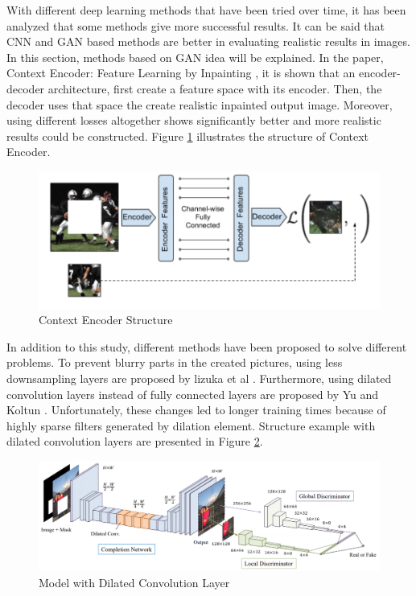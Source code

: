 With different deep learning methods that have been tried over time, it has been analyzed that some methods give more successful results. It can be said that CNN and GAN based methods are better in evaluating realistic results in images. In this section, methods based on GAN idea will be explained. \newline
In the paper, Context Encoder: Feature Learning by Inpainting \cite{context_encoders}, it is shown that an encoder-decoder architecture, first create a feature space with its encoder. Then, the decoder uses that space the create realistic inpainted output image. Moreover, using different losses altogether shows significantly better and more realistic results could be constructed. Figure \ref{fig:context-encoder} illustrates the structure of Context Encoder.

\begin{figure}[h]
    \centering
    \includegraphics[scale=0.5]{figures/chapter4/context-encoder-example.png}
    \caption{Context Encoder Structure}
    \label{fig:context-encoder}
\end{figure}

In addition to this study, different methods have been proposed to solve different problems. To prevent blurry parts in the created pictures, using less downsampling layers are proposed by lizuka et al \cite{Iizuka2017}. Furthermore, using dilated convolution layers instead of fully connected layers are proposed by Yu and Koltun \cite{dilated_conv}. Unfortunately, these changes led to longer training times because of highly sparse filters generated by dilation element. Structure example with dilated convolution layers are presented in Figure \ref{fig:dilated-model}.

\begin{figure}[h]
    \centering
    \includegraphics[scale=0.35]{figures/chapter4/Lizukaetal.PNG}
    \caption{Model with Dilated Convolution Layer}
    \label{fig:dilated-model}
\end{figure}

